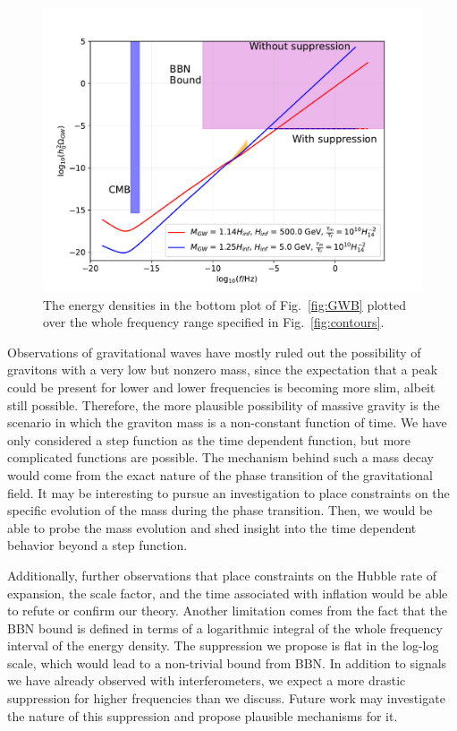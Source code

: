\documentclass[prd,twocolumn,aps,psfig,nofootinbib,nobibnotes,superscriptaddress,preprintnumbers,times]{revtex4-2}
\begin{document}
\begin{figure}[ht]
    \includegraphics[width=\linewidth]{fig/fig7.pdf}
    \caption{The energy densities in the bottom plot of Fig.\ \ref{fig:GWB} plotted over the whole frequency range specified in Fig.\ \ref{fig:contours}.}
    \label{fig:supp}
\end{figure}

Observations of gravitational waves have mostly ruled out the possibility of gravitons with a very low but nonzero mass, since the expectation that a peak could be present for lower and lower frequencies is becoming more slim, albeit still possible. Therefore, the more plausible possibility of massive gravity is the scenario in which the graviton mass is a non-constant function of time. We have only considered a step function as the time dependent function, but more complicated functions are possible. The mechanism behind such a mass decay would come from the exact nature of the phase transition of the gravitational field. It may be interesting to pursue an investigation to place constraints on the specific evolution of the mass during the phase transition. Then, we would be able to probe the mass evolution and shed insight into the time dependent behavior beyond a step function. 

Additionally, further observations that place constraints on the Hubble rate of expansion, the scale factor, and the time associated with inflation would be able to refute or confirm our theory. Another limitation comes from the fact that the BBN bound is defined in terms of a logarithmic integral of the whole frequency interval of the energy density. The suppression we propose is flat in the log-log scale, which would lead to a non-trivial bound from BBN. In addition to signals we have already observed with interferometers, we expect a more drastic suppression for higher frequencies than we discuss. Future work may investigate the nature of this suppression and propose plausible mechanisms for it.
\end{document}
